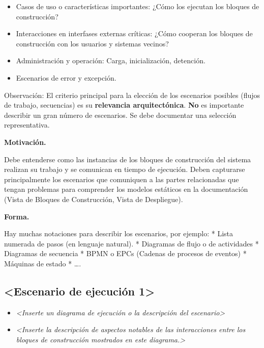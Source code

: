 \documentclass[]{article}
\begin{document}
\begin{itemize}
\item
  Casos de uso o características importantes: ¿Cómo los ejecutan los
  bloques de construcción?
\item
  Interacciones en interfases externas críticas: ¿Cómo cooperan los
  bloques de construcción con los usuarios y sistemas vecinos?
\item
  Administración y operación: Carga, inicialización, detención.
\item
  Escenarios de error y excepción.
\end{itemize}

Observación: El criterio principal para la elección de los escenarios
posibles (flujos de trabajo, secuencias) es su \textbf{relevancia
arquitectónica}. \textbf{No} es importante describir un gran número de
escenarios. Se debe documentar una selección representativa.

\textbf{Motivación.}

Debe entenderse como las instancias de los bloques de construcción del
sistema realizan su trabajo y se comunican en tiempo de ejecución. Deben
capturarse principalmente los escenarios que comuniquen a las partes
relacionadas que tengan problemas para comprender los modelos estáticos
en la documentación (Vista de Bloques de Construcción, Vista de
Despliegue).

\textbf{Forma.}

Hay muchas notaciones para describir los escenarios, por ejemplo: *
Lista numerada de pasos (en lenguaje natural). * Diagramas de flujo o de
actividades * Diagramas de secuencia * BPMN o EPCs (Cadenas de procesos
de eventos) * Máquinas de estado * \ldots{}.

\hypertarget{__escenario_de_ejecuci_n_1}{%
\subsection{\textless{}Escenario de ejecución
1\textgreater{}}\label{__escenario_de_ejecuci_n_1}}

\begin{itemize}
\item
  \emph{\textless{}Inserte un diagrama de ejecución o la descripción del
  escenario\textgreater{}}
\item
  \emph{\textless{}Inserte la descripción de aspectos notables de las
  interacciones entre los bloques de construcción mostrados en este
  diagrama.\textgreater{}}
\end{itemize}
\end{document}
